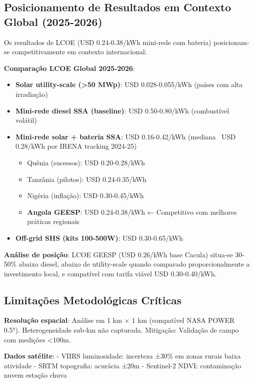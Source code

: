 \documentclass[12pt, a4paper]{article}
\begin{document}
\subsection{Posicionamento de Resultados em Contexto Global (2025-2026)}

Os resultados de LCOE (USD 0.24-0.38/kWh mini-rede com bateria) posicionam-se competitivamente em contexto internacional:

\textbf{Comparação LCOE Global 2025-2026}:

\begin{itemize}
  \item \textbf{Solar utility-scale (>50 MWp)}: USD 0.028-0.055/kWh (países com alta irradiação)
  \item \textbf{Mini-rede diesel SSA (baseline)}: USD 0.50-0.80/kWh (combustível volátil)
  \item \textbf{Mini-rede solar + bateria SSA}: USD 0.16-0.42/kWh (mediana ~USD 0.28/kWh por IRENA tracking 2024-25)
  \begin{itemize}
    \item Quênia (sucessos): USD 0.20-0.28/kWh
    \item Tanzânia (pilotos): USD 0.24-0.35/kWh
    \item Nigéria (inflação): USD 0.30-0.45/kWh
    \item \textbf{Angola GEESP}: USD 0.24-0.38/kWh ← Competitivo com melhores práticas regionais
  \end{itemize}
  \item \textbf{Off-grid SHS (kits 100-500W)}: USD 0.30-0.65/kWh
\end{itemize}

\textbf{Análise de posição}: LCOE GEESP (USD 0.26/kWh base Cacula) situa-se 30-50\% abaixo diesel, abaixo de utility-scale quando comparado proporcionalmente a investimento local, e compatível com tarifa viável USD 0.30-0.40/kWh.

\subsection{Limitações Metodológicas Críticas}

\textbf{Resolução espacial}: Análise em 1 km × 1 km (compatível NASA POWER 0.5°). Heterogeneidade sub-km não capturada. Mitigação: Validação de campo com medições <100m.

\textbf{Dados satélite}: 
- VIIRS luminosidade: incerteza ±30\% em zonas rurais baixa atividade
- SRTM topografia: acurácia ±20m
- Sentinel-2 NDVI: contaminação nuvem estação chuva
\end{document}
